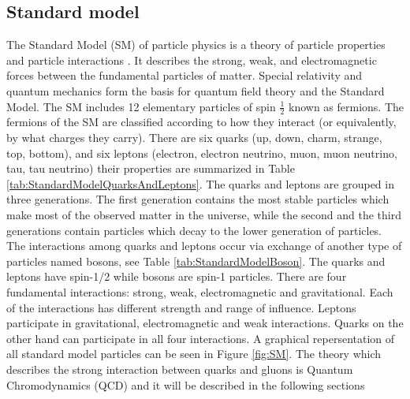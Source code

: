\subsection{Standard model}
The Standard Model (SM) of particle physics is a theory of particle properties and
particle interactions \cite{SM}. It describes the strong, weak, and electromagnetic forces between
the fundamental particles of matter. Special relativity and quantum mechanics
form the basis for quantum field theory and the Standard Model.
The SM includes 12 elementary particles of spin $\frac{1}{2}$ known as fermions. The
fermions of the SM are classified according to how they interact (or equivalently,
by what charges they carry). There are six quarks (up, down, charm, strange, top,
bottom), and six leptons (electron, electron neutrino, muon, muon neutrino, tau, tau
neutrino) their properties are summarized in Table \ref{tab:StandardModelQuarksAndLeptons}. 
The quarks and leptons are grouped in three generations. 
The first generation contains the most stable particles which make most of the observed matter in the
universe, while the second and the third generations contain particles which decay to the lower
generation of particles.
The interactions among quarks and leptons occur via exchange of another type of particles
named bosons, see Table \ref{tab:StandardModelBoson}. The quarks and leptons have spin-1/2 while bosons are spin-1
particles. There are four fundamental interactions: strong, weak, electromagnetic and gravitational.
Each of the interactions has different strength and range of influence. Leptons
participate in gravitational, electromagnetic and weak interactions. Quarks on the other hand
can participate in all four interactions.
A graphical repersentation of all standard model particles can be seen in Figure \ref{fig:SM}.
The theory which describes the strong interaction between quarks and gluons is Quantum
Chromodynamics (QCD) and it will be described in the following sections


